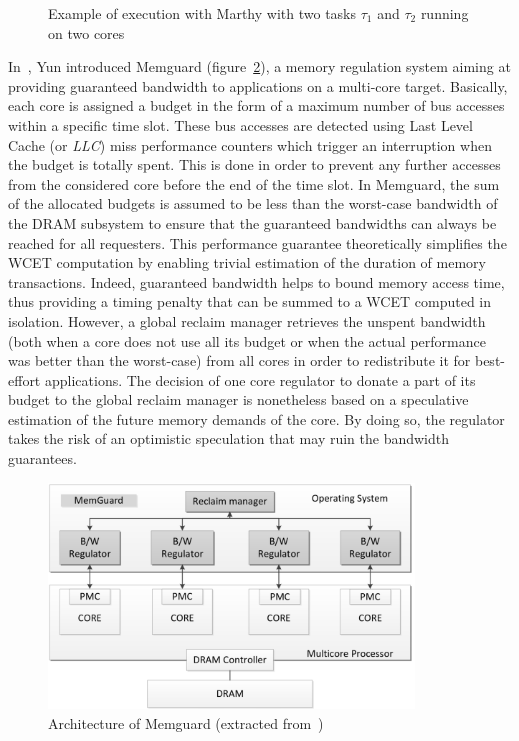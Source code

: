 \documentclass[main.tex]{subfiles}
\begin{document}
\begin{figure}
    \centering
    
    \caption{Example of execution with {\sc Marthy} with two tasks $\tau_1$ and $\tau_2$ running on two cores}
    \label{fig_stateOfTheArt_MarthyDiagram}
\end{figure}

In~\cite{Yun2013}, Yun \etal introduced Memguard (figure~\ref{fig_stateOfTheArt_Memguard}), a memory regulation system aiming at providing guaranteed bandwidth to applications on a multi-core target. Basically, each core is assigned a budget in the form of a maximum number of bus accesses within a specific time slot. These bus accesses are detected using Last Level Cache (or \emph{LLC}) miss performance counters which trigger an interruption when the budget is totally spent. This is done in order to prevent any further accesses from the considered core before the end of the time slot. In Memguard, the sum of the allocated budgets is assumed to be less than the worst-case bandwidth of the DRAM subsystem to ensure that the guaranteed bandwidths can always be reached for all requesters. 
This performance guarantee theoretically simplifies the WCET computation by enabling trivial estimation of the duration of memory transactions. Indeed, guaranteed bandwidth helps to bound memory access time, thus providing a timing penalty that can be summed to a WCET computed in isolation. However, a global reclaim manager retrieves the unspent bandwidth (both when a core does not use all its budget or when the actual performance was better than the worst-case) from all cores in order to redistribute it for best-effort applications. The decision of one core regulator to donate a part of its budget to the global reclaim manager is nonetheless based on a speculative estimation of the future memory demands of the core. By doing so, the regulator takes the risk of an optimistic speculation that may ruin the bandwidth guarantees. \\

\begin{figure}
    \centering
    \includegraphics[height=6cm]{imgs/png/stateOfTheArt_Memguard.png}
    \caption{Architecture of Memguard (extracted from~\cite{Yun2013})}
    \label{fig_stateOfTheArt_Memguard}
\end{figure}
\end{document}
